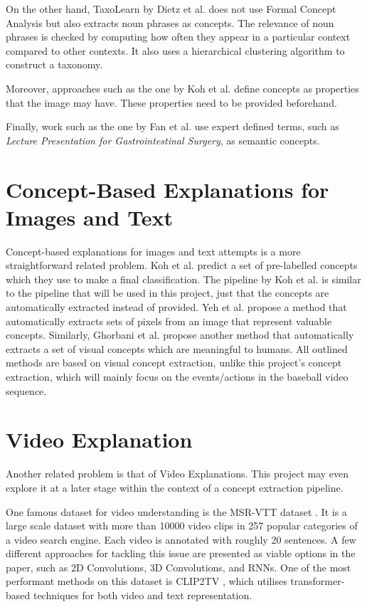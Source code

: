 On the other hand, TaxoLearn \cite{RefWorks:RefID:34-dietz2012taxolearn} by Dietz et al. does not use Formal Concept Analysis but also extracts noun phrases as concepts. The relevance of noun phrases is checked by computing how often they appear in a particular context compared to other contexts. It also uses a hierarchical clustering algorithm to construct a taxonomy.

Moreover, approaches such as the one by Koh et al. \cite{RefWorks:RefID:35-koh2020concept} define concepts as properties that the image may have. These properties need to be provided beforehand.

Finally, work such as the one by Fan et al. \cite{RefWorks:RefID:50-fan2004semantic} use expert defined terms, such as \emph{Lecture Presentation for Gastrointestinal Surgery}, as semantic concepts. 


\section{Concept-Based Explanations for Images and Text}

Concept-based explanations for images and text attempts is a more straightforward related problem.
Koh et al. \cite{RefWorks:RefID:35-koh2020concept} predict a set of pre-labelled concepts which they use to make a final classification.
The pipeline by Koh et al. is similar to the pipeline that will be used in this project, just that the concepts are automatically extracted instead of provided.
Yeh et al. \cite{RefWorks:RefID:36-yeh2019completeness-aware} propose a method that automatically extracts sets of pixels from an image that represent valuable concepts.
Similarly, Ghorbani et al. \cite{RefWorks:RefID:37-ghorbani2019automatic} propose another method that automatically extracts a set of visual concepts which are meaningful to humans.
All outlined methods are based on visual concept extraction, unlike this project's concept extraction, which will mainly focus on the events/actions in the baseball video sequence.


\section{Video Explanation}

Another related problem is that of Video Explanations. This project may even explore it at a later stage within the context of a concept extraction pipeline.

One famous dataset for video understanding is the MSR-VTT dataset \cite{RefWorks:RefID:40-jun2016msr-vtt:}. It is a large scale dataset with more than 10000 video clips in 257 popular categories of a video search engine.
Each video is annotated with roughly 20 sentences. 
A few different approaches for tackling this issue are presented as viable options in the paper, such as 2D Convolutions, 3D Convolutions, and RNNs.
One of the most performant methods on this dataset is CLIP2TV \cite{RefWorks:RefID:41-gao2021clip2tv:}, which utilises transformer-based techniques for both video and text representation.


